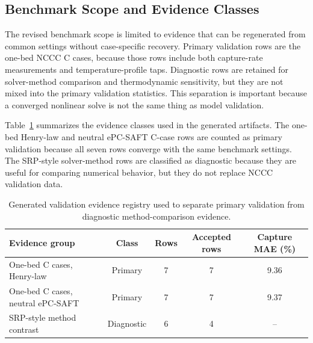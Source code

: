     \subsection{Benchmark Scope and Evidence Classes}
        The revised benchmark scope is limited to evidence that can be regenerated from common settings without case-specific recovery. Primary validation rows are the one-bed NCCC C cases, because those rows include both capture-rate measurements and temperature-profile taps. Diagnostic rows are retained for solver-method comparison and thermodynamic sensitivity, but they are not mixed into the primary validation statistics. This separation is important because a converged nonlinear solve is not the same thing as model validation.

        Table~\ref{tab:validation-evidence-registry} summarizes the evidence classes used in the generated artifacts. The one-bed Henry-law and neutral ePC-SAFT C-case rows are counted as primary validation because all seven rows converge with the same benchmark settings. The SRP-style solver-method rows are classified as diagnostic because they are useful for comparing numerical behavior, but they do not replace NCCC validation data.

        \begin{table}
            \centering
            \small
            \caption{Generated validation evidence registry used to separate primary validation from diagnostic method-comparison evidence.}
            \label{tab:validation-evidence-registry}
            \renewcommand{\arraystretch}{1.2}
            \begin{tabular}{lcccc}
                \toprule
                \textbf{Evidence group} & \textbf{Class} & \textbf{Rows} & \textbf{Accepted rows} & \textbf{Capture MAE (\%)} \\
                \midrule
                One-bed C cases, Henry-law & Primary & 7 & 7 & 9.36 \\
                One-bed C cases, neutral ePC-SAFT & Primary & 7 & 7 & 9.37 \\
                SRP-style method contrast & Diagnostic & 6 & 4 & -- \\
                \bottomrule
            \end{tabular}
        \end{table}

